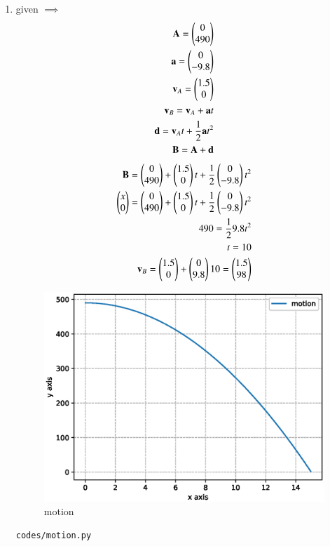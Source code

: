 \renewcommand{\theequation}{\theenumi}
\begin{enumerate}[label=\arabic*.,ref=\thesubsection.\theenumi]

\item given $\implies$
\\
\begin{align}
\mathbf A = \begin{pmatrix}0\\490\end{pmatrix}
\\
\mathbf a = \begin{pmatrix}0\\-9.8\end{pmatrix}
\\
\mathbf v_A = \begin{pmatrix}1.5\\0\end{pmatrix}
\\
\mathbf v_B =  \mathbf v_A  + \mathbf a t
\\
\mathbf d = \mathbf v_A t + \frac{1}{2}\mathbf a t^2
\\
\mathbf B = \mathbf A + \mathbf d
\end{align}
\begin{align}
\mathbf B = \begin{pmatrix}0\\490\end{pmatrix} + \begin{pmatrix}1.5\\0\end{pmatrix}t +\frac{1}{2}\begin{pmatrix}0\\-9.8\end{pmatrix} t^2
\\
\begin{pmatrix}x\\0\end{pmatrix} = \begin{pmatrix}0\\490\end{pmatrix} + \begin{pmatrix}1.5\\0\end{pmatrix}t +\frac{1}{2}\begin{pmatrix}0\\-9.8\end{pmatrix} t^2
\\
490 = \frac{1}{2} 9.8t^2
\\
t = 10
\\
\mathbf v_B = \begin{pmatrix}1.5\\0\end{pmatrix} + \begin{pmatrix}0\\9.8\end{pmatrix}10 = \begin{pmatrix}1.5\\98\end{pmatrix}
\end{align}
\begin{figure}[!ht]
	\centering
	\includegraphics[width=\columnwidth]{./figures/motion.eps}
	\caption{motion }
	\label{fig:motion}
\end{figure}

\begin{lstlisting}
codes/motion.py
\end{lstlisting}

\end{enumerate}